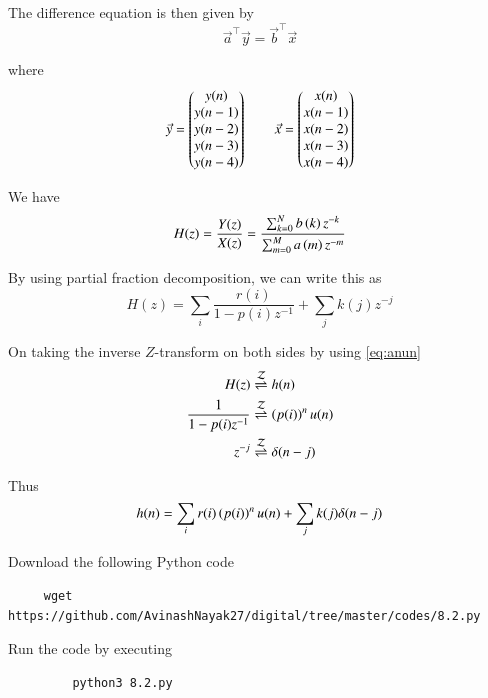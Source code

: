 \documentclass[journal,12pt,twocolumn]{IEEEtran}
\renewcommand\thesection{\arabic{section}}
\begin{document}
\begin{enumerate}[label=\thesection.\arabic*]
       The difference equation is then given by
       \begin{equation}
         \vec{a}^\top \vec{y} = \vec{b}^\top \vec{x} 
       \end{equation}
       
       where
       \begin{align}
         \vec{y} = \begin{pmatrix}y(n) \\ y(n-1) \\ y(n-2) \\ y(n-3) \\ y(n-4)\end{pmatrix} \qquad
         \vec{x} = \begin{pmatrix}x(n) \\ x(n-1) \\ x(n-2) \\ x(n-3) \\ x(n-4)\end{pmatrix}
       \end{align}
       
       We have
       \begin{equation}
         H(z) = \frac{Y(z)}{X(z)} = \frac{\sum _{k=0}^{N}b\left(k\right) z^{-k}}{\sum _{m=0}^{M}a\left(m\right) z^{-m}}
       \end{equation}
       
       By using partial fraction decomposition, we can write this as
       \begin{equation}
         H(z) = \sum_i \frac{r(i)}{1-p(i)z^{-1}} + \sum_j k(j)z^{-j}
       \end{equation}
       
       On taking the inverse $Z$-transform on both sides by using \eqref{eq:anun}
       \begin{align}
         H(z) &\overset{\mathcal{Z}}{ \rightleftharpoons} h(n) \\
         \frac{1}{1-p(i)z^{-1}} &\overset{\mathcal{Z}}{ \rightleftharpoons} \left(p(i)\right)^nu(n) \\
         z^{-j} &\overset{\mathcal{Z}}{ \rightleftharpoons} \delta(n-j) 
       \end{align}
       
       Thus
       \begin{align}
         h(n) = \sum_i r(i)\left(p(i)\right)^nu(n) + \sum_j k(j)\delta(n-j)
       \end{align}
       
     Download the following Python code
       \begin{lstlisting}
     wget https://github.com/AvinashNayak27/digital/tree/master/codes/8.2.py
       \end{lstlisting}
       
       Run the code by executing
       \begin{lstlisting}
         python3 8.2.py
       \end{lstlisting}
       

\end{enumerate}
\end{document}
